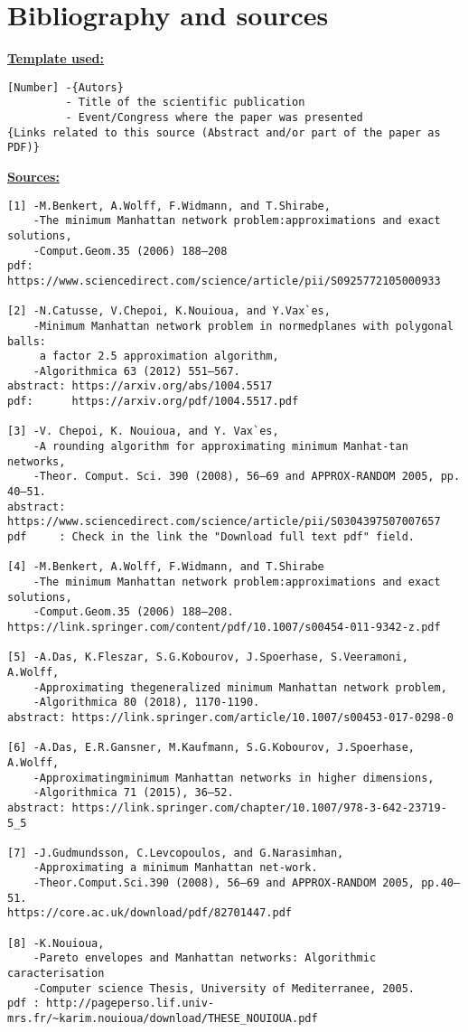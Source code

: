 \chapter{Bibliography and sources}
\underline{\textbf{Template used:}}
\begin{quoting} \begin{verbatim}
[Number] -{Autors}
         - Title of the scientific publication
         - Event/Congress where the paper was presented
{Links related to this source (Abstract and/or part of the paper as PDF)}
\end{verbatim} \end{quoting} 

\underline{\textbf{Sources:}}
\begin{quoting} \begin{verbatim}
[1] -M.Benkert, A.Wolff, F.Widmann, and T.Shirabe,
    -The minimum Manhattan network problem:approximations and exact solutions,
    -Comput.Geom.35 (2006) 188–208
pdf: https://www.sciencedirect.com/science/article/pii/S0925772105000933

[2] -N.Catusse, V.Chepoi, K.Nouioua, and Y.Vax`es,
    -Minimum Manhattan network problem in normedplanes with polygonal balls: 
     a factor 2.5 approximation algorithm,
    -Algorithmica 63 (2012) 551–567.
abstract: https://arxiv.org/abs/1004.5517
pdf:      https://arxiv.org/pdf/1004.5517.pdf

[3] -V. Chepoi, K. Nouioua, and Y. Vax`es,
    -A rounding algorithm for approximating minimum Manhat-tan networks, 
    -Theor. Comput. Sci. 390 (2008), 56–69 and APPROX-RANDOM 2005, pp. 40–51.
abstract: https://www.sciencedirect.com/science/article/pii/S0304397507007657
pdf     : Check in the link the "Download full text pdf" field.

[4] -M.Benkert, A.Wolff, F.Widmann, and T.Shirabe 
    -The minimum Manhattan network problem:approximations and exact solutions,
    -Comput.Geom.35 (2006) 188–208.
https://link.springer.com/content/pdf/10.1007/s00454-011-9342-z.pdf

[5] -A.Das, K.Fleszar, S.G.Kobourov, J.Spoerhase, S.Veeramoni, A.Wolff,
    -Approximating thegeneralized minimum Manhattan network problem,
    -Algorithmica 80 (2018), 1170-1190.
abstract: https://link.springer.com/article/10.1007/s00453-017-0298-0

[6] -A.Das, E.R.Gansner, M.Kaufmann, S.G.Kobourov, J.Spoerhase, A.Wolff,
    -Approximatingminimum Manhattan networks in higher dimensions,
    -Algorithmica 71 (2015), 36–52.
abstract: https://link.springer.com/chapter/10.1007/978-3-642-23719-5_5

[7] -J.Gudmundsson, C.Levcopoulos, and G.Narasimhan,
    -Approximating a minimum Manhattan net-work.
    -Theor.Comput.Sci.390 (2008), 56–69 and APPROX-RANDOM 2005, pp.40–51.
https://core.ac.uk/download/pdf/82701447.pdf

[8] -K.Nouioua, 
    -Pareto envelopes and Manhattan networks: Algorithmic caracterisation 
    -Computer science Thesis, University of Mediterranee, 2005.
pdf : http://pageperso.lif.univ-mrs.fr/~karim.nouioua/download/THESE_NOUIOUA.pdf
\end{verbatim} \end{quoting}
